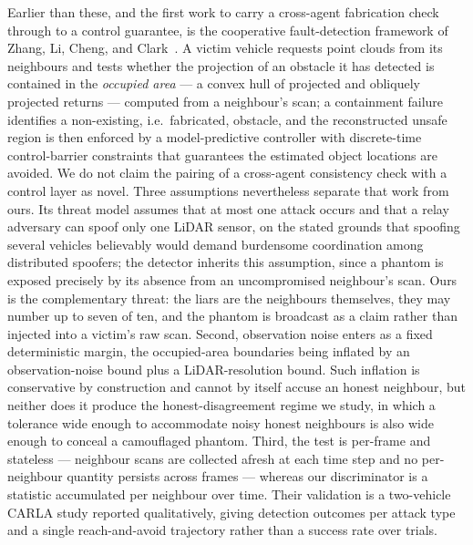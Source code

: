 Earlier than these, and the first work to carry a cross-agent fabrication
check through to a control guarantee, is the cooperative fault-detection
framework of Zhang, Li, Cheng, and Clark~\cite{lidarspoof2023}. A victim
vehicle requests point clouds from its neighbours and tests whether the
projection of an obstacle it has detected is contained in the \emph{occupied
area} --- a convex hull of projected and obliquely projected returns ---
computed from a neighbour's scan; a containment failure identifies a
non-existing, i.e.\ fabricated, obstacle, and the reconstructed unsafe region
is then enforced by a model-predictive controller with discrete-time
control-barrier constraints that guarantees the estimated object locations
are avoided. We do not claim the pairing of a cross-agent consistency check
with a control layer as novel. Three assumptions nevertheless separate that
work from ours. Its threat model assumes that at most one attack occurs and
that a relay adversary can spoof only one LiDAR sensor, on the stated grounds
that spoofing several vehicles believably would demand burdensome
coordination among distributed spoofers; the detector inherits this
assumption, since a phantom is exposed precisely by its absence from an
uncompromised neighbour's scan. Ours is the complementary threat: the liars
are the neighbours themselves, they may number up to seven of ten, and the
phantom is broadcast as a claim rather than injected into a victim's raw
scan. Second, observation noise enters as a fixed deterministic margin, the
occupied-area boundaries being inflated by an observation-noise bound plus a
LiDAR-resolution bound. Such inflation is conservative by construction and
cannot by itself accuse an honest neighbour, but neither does it produce the
honest-disagreement regime we study, in which a tolerance wide enough to
accommodate noisy honest neighbours is also wide enough to conceal a
camouflaged phantom. Third, the test is per-frame and stateless --- neighbour
scans are collected afresh at each time step and no per-neighbour quantity
persists across frames --- whereas our discriminator is a statistic
accumulated per neighbour over time. Their validation is a two-vehicle CARLA
study reported qualitatively, giving detection outcomes per attack type and a
single reach-and-avoid trajectory rather than a success rate over trials.

